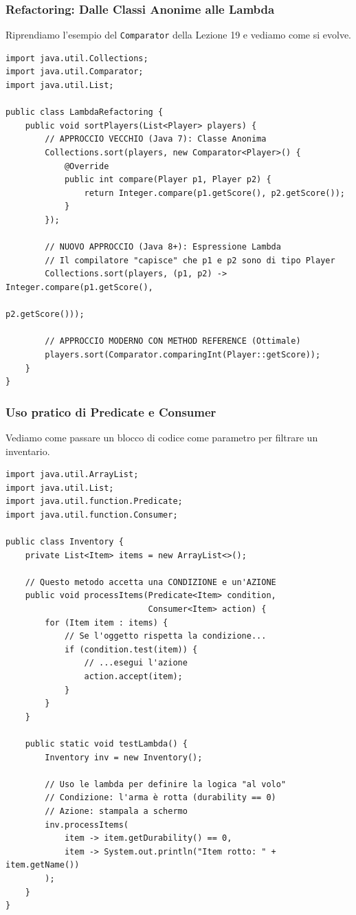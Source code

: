 \documentclass[12pt, a4paper]{article}
\begin{document}
\newpage

\subsubsection{Refactoring: Dalle Classi Anonime alle Lambda}
Riprendiamo l'esempio del \texttt{Comparator} della Lezione 19 e vediamo come si evolve.

\begin{verbatim}
import java.util.Collections;
import java.util.Comparator;
import java.util.List;

public class LambdaRefactoring {
    public void sortPlayers(List<Player> players) {
        // APPROCCIO VECCHIO (Java 7): Classe Anonima
        Collections.sort(players, new Comparator<Player>() {
            @Override
            public int compare(Player p1, Player p2) {
                return Integer.compare(p1.getScore(), p2.getScore());
            }
        });

        // NUOVO APPROCCIO (Java 8+): Espressione Lambda
        // Il compilatore "capisce" che p1 e p2 sono di tipo Player
        Collections.sort(players, (p1, p2) -> Integer.compare(p1.getScore(),
                                                              p2.getScore()));

        // APPROCCIO MODERNO CON METHOD REFERENCE (Ottimale)
        players.sort(Comparator.comparingInt(Player::getScore));
    }
}
\end{verbatim}

\newpage

\subsubsection{Uso pratico di Predicate e Consumer}
Vediamo come passare un blocco di codice come parametro per filtrare un inventario.

\begin{verbatim}
import java.util.ArrayList;
import java.util.List;
import java.util.function.Predicate;
import java.util.function.Consumer;

public class Inventory {
    private List<Item> items = new ArrayList<>();

    // Questo metodo accetta una CONDIZIONE e un'AZIONE
    public void processItems(Predicate<Item> condition, 
                             Consumer<Item> action) {
        for (Item item : items) {
            // Se l'oggetto rispetta la condizione...
            if (condition.test(item)) {
                // ...esegui l'azione
                action.accept(item);
            }
        }
    }

    public static void testLambda() {
        Inventory inv = new Inventory();
        
        // Uso le lambda per definire la logica "al volo"
        // Condizione: l'arma è rotta (durability == 0)
        // Azione: stampala a schermo
        inv.processItems(
            item -> item.getDurability() == 0, 
            item -> System.out.println("Item rotto: " + item.getName())
        );
    }
}
\end{verbatim}
\end{document}
